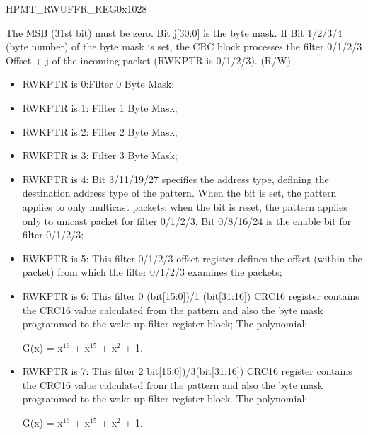 \begin{register}{H}{PMT\_RWUFFR\_REG}{0x1028}\label{regdesc:PMT_RWUFFRREG}
%
\regnewline%
\begin{regdesc}\begin{reglist}
\item [WKUPPKTFILTER]The MSB (31st bit) must be zero. Bit j[30:0] is the byte mask. If Bit 1/2/3/4 (byte number) of the byte mask is set, the CRC block processes the filter 0/1/2/3 Offset + j of the incoming packet (RWKPTR is 0/1/2/3). (R/W)
\begin{itemize}
\item RWKPTR is 0:Filter 0 Byte Mask; \item RWKPTR is 1: Filter 1 Byte Mask; \item RWKPTR is 2: Filter 2 Byte Mask; \item RWKPTR is 3: Filter 3 Byte Mask; \item RWKPTR is 4: Bit 3/11/19/27 specifies the address type, defining the destination address type of the pattern. When the bit is set, the pattern applies to only multicast packets; when the bit is reset, the pattern applies only to unicast packet for filter 0/1/2/3. Bit 0/8/16/24 is the enable bit for filter 0/1/2/3; \item RWKPTR is 5: This filter 0/1/2/3 offset register defines the offset (within the packet) from which the filter 0/1/2/3 examines the packets;
\item RWKPTR is 6: This filter 0 (bit[15:0])/1 (bit[31:16]) CRC16 register contains the CRC16 value calculated from the pattern and also the byte mask programmed to the wake-up filter register block; The polynomial:

G(x) = x$^\text{16}$ + x$^\text{15}$ + x$^\text{2}$ + 1.
\item RWKPTR is 7: This filter 2 bit[15:0])/3(bit[31:16]) CRC16 register contains the CRC16 value calculated from the pattern and also the byte mask programmed to the wake-up filter register block. The polynomial:

G(x) = x$^\text{16}$ + x$^\text{15}$ + x$^\text{2}$ + 1.
\end{itemize}
\end{reglist}\end{regdesc}
\end{register}


